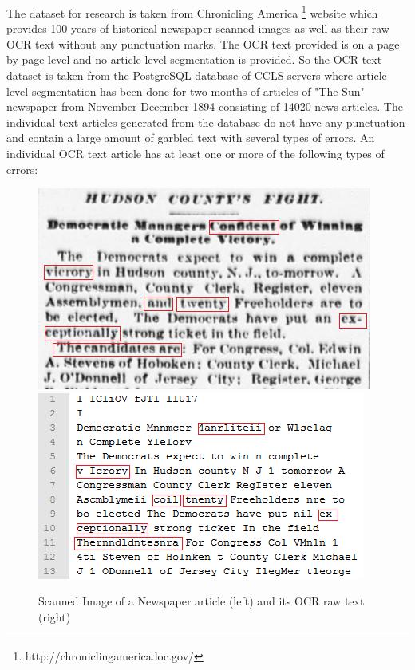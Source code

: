 \documentclass[letterpaper,11pt]{report}
\begin{document}
The dataset for research is taken from Chronicling America \footnote{http://chroniclingamerica.loc.gov/} website which provides 100 years of historical newspaper scanned images as well as their raw OCR text without any punctuation marks. The OCR text provided is on a page by page level and no article level segmentation is provided. So the OCR text dataset is taken from the PostgreSQL database of CCLS servers where article level segmentation has been done for two months of articles of "The Sun" newspaper from November-December 1894 consisting of 14020 news articles. The individual text articles generated from the database do not have any punctuation and contain a large amount of garbled text with several types of errors. An individual OCR text article has at least one or more of the following types of errors:

\begin{figure}[hbt]
\includegraphics[scale=0.75]{originalimage}
\includegraphics[scale=0.80]{ocr}
\caption{Scanned Image of a Newspaper article (left) and its OCR raw text (right)}
\end{figure}
\end{document}
